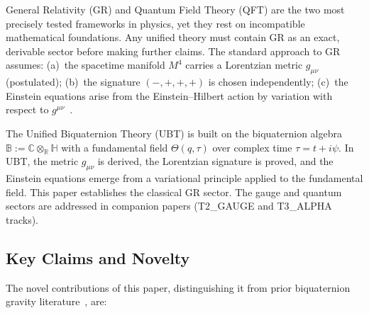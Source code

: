 \documentclass[12pt,a4paper]{article}
\theoremstyle{definition}
\theoremstyle{remark}
\newcommand{\BB}{\mathbb{B}}
\newcommand{\CC}{\mathbb{C}}
\newcommand{\RR}{\mathbb{R}}
\newcommand{\HH}{\mathbb{H}}
\begin{document}
General Relativity (GR) and Quantum Field Theory (QFT) are the two most
precisely tested frameworks in physics, yet they rest on incompatible
mathematical foundations.
Any unified theory must contain GR as an exact, derivable sector before
making further claims.
The standard approach to GR assumes:
(a)~the spacetime manifold $M^4$ carries a Lorentzian metric $g_{\mu\nu}$
(postulated);
(b)~the signature $(-,+,+,+)$ is chosen independently;
(c)~the Einstein equations arise from the Einstein--Hilbert action by
variation with respect to $g^{\mu\nu}$~\cite{einstein1915,hilbert1915}.

The Unified Biquaternion Theory (UBT) is built on the biquaternion algebra
$\BB := \CC\otimes_\RR\HH$ with a fundamental field
$\Theta(q,\tau)$ over complex time $\tau = t + i\psi$.
In UBT, the metric $g_{\mu\nu}$ is derived, the Lorentzian signature is proved,
and the Einstein equations emerge from a variational principle applied to
the fundamental field.
This paper establishes the classical GR sector.
The gauge and quantum sectors are addressed in companion papers
(T2\_GAUGE and T3\_ALPHA tracks).

\subsection{Key Claims and Novelty}

The novel contributions of this paper, distinguishing it from prior biquaternion
gravity literature~\cite{adler1995,finkelstein1962,deleo1996}, are:
\end{document}
